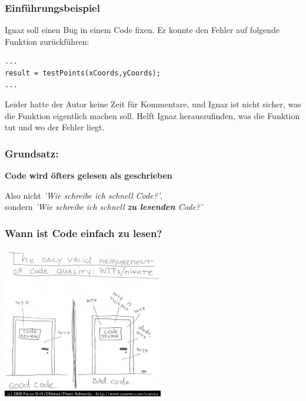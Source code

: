 \documentclass{beamer}
\begin{document}
\begin{frame}[fragile]
    \frametitle{Einführungsbeispiel}
    Ignaz soll einen Bug in einem Code fixen. Er konnte den Fehler auf folgende
    Funktion zurückführen:
\begin{lstlisting}
...
result = testPoints(xCoords,yCoords);
...
\end{lstlisting}
Leider hatte der Autor keine Zeit für Kommentare, und Ignaz ist nicht sicher,
was die Funktion eigentlich machen soll. Helft Ignaz herauszufinden,
was die Funktion  tut und wo der Fehler liegt.
\end{frame}

\begin{frame}
    \frametitle{Grundsatz:}
    \begin{center}
        \huge \bf Code wird öfters gelesen als geschrieben
    \end{center}
    \vspace{2em}\pause
    Also nicht \textit{'Wie schreibe ich schnell Code?'}, \\
    sondern \textit{'Wie schreibe ich schnell \textbf{zu lesenden} Code?'}
\end{frame}

\begin{frame}
    \frametitle{Wann ist Code einfach zu lesen?}
    \begin{center}
        \includegraphics[width=7cm]{wtfm.jpg}
    \end{center}
\end{frame}
\end{document}
